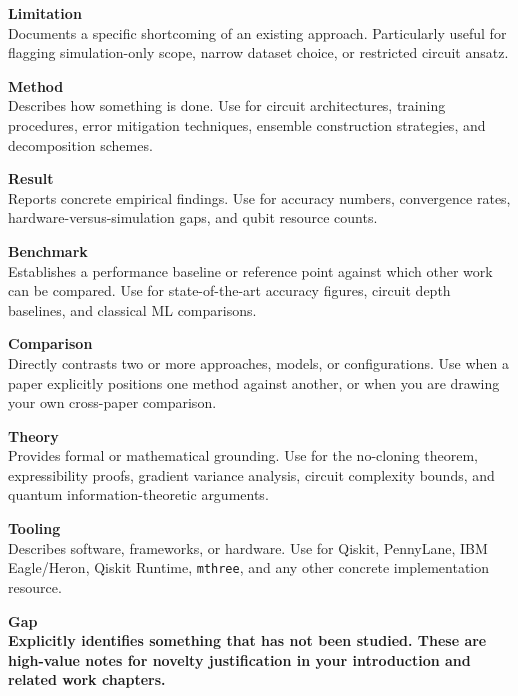 \documentclass[]{UCD_CS_FYP_Report}
\newcommand{\limitation}[1]{{\color{orange}#1}}
\newcommand{\method}[1]{{\color{cyan!70!black}#1}}
\newcommand{\result}[1]{{\color{yellow!60!black}#1}}
\newcommand{\benchmark}[1]{{\color{violet}#1}}
\newcommand{\comparison}[1]{{\color{magenta!70!black}#1}}
\newcommand{\theory}[1]{{\color{gray}#1}}
\newcommand{\tooling}[1]{{\color{brown}#1}}
\newcommand{\gap}[1]{{\color{black}\textbf{#1}}}
\begin{document}
\bigskip

\limitation{\large \textbf{Limitation}\\
\normalsize Documents a specific shortcoming of an existing approach. Particularly useful for flagging simulation-only scope, narrow dataset choice, or restricted circuit ansatz.}

\bigskip

\method{\large \textbf{Method}\\
\normalsize Describes how something is done. Use for circuit architectures, training procedures, error mitigation techniques, ensemble construction strategies, and decomposition schemes.}

\bigskip

\result{\large \textbf{Result}\\
\normalsize Reports concrete empirical findings. Use for accuracy numbers, convergence rates, hardware-versus-simulation gaps, and qubit resource counts.}

\bigskip

\benchmark{\large \textbf{Benchmark}\\
\normalsize Establishes a performance baseline or reference point against which other work can be compared. Use for state-of-the-art accuracy figures, circuit depth baselines, and classical ML comparisons.}

\bigskip

\comparison{\large \textbf{Comparison}\\
\normalsize Directly contrasts two or more approaches, models, or configurations. Use when a paper explicitly positions one method against another, or when you are drawing your own cross-paper comparison.}

\bigskip

\theory{\large \textbf{Theory}\\
\normalsize Provides formal or mathematical grounding. Use for the no-cloning theorem, expressibility proofs, gradient variance analysis, circuit complexity bounds, and quantum information-theoretic arguments.}

\bigskip

\tooling{\large \textbf{Tooling}\\
\normalsize Describes software, frameworks, or hardware. Use for Qiskit, PennyLane, IBM Eagle/Heron, Qiskit Runtime, \texttt{mthree}, and any other concrete implementation resource.}

\bigskip

\gap{\large \textbf{Gap}\\
\normalsize Explicitly identifies something that has not been studied. These are high-value notes for novelty justification in your introduction and related work chapters.}
\end{document}
